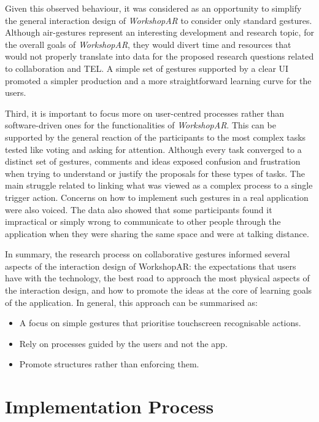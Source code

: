 Given this observed behaviour, it was considered as an opportunity to simplify the general interaction design of \emph{WorkshopAR} to consider only standard gestures.
Although air-gestures represent an interesting development and research topic, for the overall goals of \emph{WorkshopAR}, they would divert time and resources that would
not properly translate into data for the proposed research questions related to collaboration and \acf{TEL}. A simple set of gestures supported by a clear UI promoted a
simpler production and a more straightforward learning curve for the users.

Third, it is important to focus more on user-centred processes rather than software-driven ones for the functionalities of \emph{WorkshopAR}. This can be supported by the
general reaction of the participants to the most complex tasks tested like voting and asking for attention. Although every task converged to a distinct set of gestures,
comments and ideas exposed confusion and frustration when trying to understand or justify the proposals for these types of tasks. The main struggle related to linking what
was viewed as a complex process to a single trigger action. Concerns on how to implement such gestures in a real application were also voiced. The data also showed that
some participants found it impractical or simply wrong to communicate to other people through the application when they were sharing the same space and were at talking
distance.

In summary, the research process on collaborative gestures informed several aspects of the interaction design of WorkshopAR: the expectations that users have with the
technology, the best road to approach the most physical aspects of the interaction design, and how to promote the ideas at the core of learning goals of the application.
In general, this approach can be summarised as:

\begin{itemize}
    \item A focus on simple gestures that prioritise touchscreen recognisable actions.
    \item Rely on processes guided by the users and not the app.
    \item Promote structures rather than enforcing them.
\end{itemize}

\section{Implementation Process \label{sec:5-2}}

